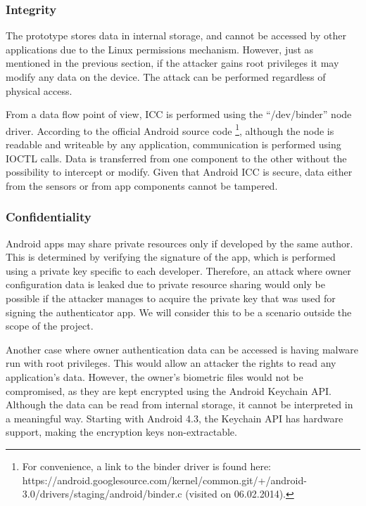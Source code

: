 \subsubsection*{Integrity}
The prototype stores data in internal storage, and cannot be accessed by other applications due to the Linux permissions mechanism. However, just as mentioned in the previous section, if the attacker gains root privileges it may modify any data on the device. The attack can be performed regardless of physical access.

From a data flow point of view, ICC is performed using the ``/dev/binder'' node driver. According to the official Android source code \footnote{For convenience, a link to the binder driver is found here: https://android.googlesource.com/kernel/common.git/+/android-3.0/drivers/staging/android/binder.c (visited on 06.02.2014).}, although the node is readable and writeable by any application, communication is performed using IOCTL calls. Data is transferred from one component to the other without the possibility to intercept or modify. Given that Android ICC is secure, data either from the sensors or from app components cannot be tampered.

\subsubsection*{Confidentiality}
Android apps may share private resources only if developed by the same author. This is determined by verifying the signature of the app, which is performed using a private key specific to each developer. Therefore, an attack where owner configuration data is leaked due to private resource sharing would only be possible if the attacker manages to acquire the private key that was used for signing the authenticator app. We will consider this to be a scenario outside the scope of the project.

Another case where owner authentication data can be accessed is having malware run with root privileges. This would allow an attacker the rights to read any application's data. However, the owner's biometric files would not be compromised, as they are kept encrypted using the Android Keychain API. Although the data can be read from internal storage, it cannot be interpreted in a meaningful way. Starting with Android 4.3, the Keychain API has hardware support, making the encryption keys non-extractable. 

